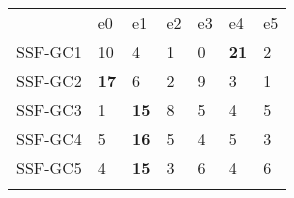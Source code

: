 \begin{tabular}{lllllll}
\noalign{\smallskip}\hline\noalign{\smallskip}
 & e0 & e1 & e2 & e3 & e4 & e5 \\
\noalign{\smallskip}\hline\noalign{\smallskip}
 
SSF-GC1 & 10 & 4 & 1 & 0 & \textbf{21} & 2 \\
SSF-GC2 & \textbf{17} & 6 & 2 & 9 & 3 & 1 \\
SSF-GC3 & 1 & \textbf{15} & 8 & 5 & 4 & 5 \\
SSF-GC4 & 5 & \textbf{16} & 5 & 4 & 5 & 3 \\
SSF-GC5 & 4 & \textbf{15} & 3 & 6 & 4 & 6 \\


\noalign{\smallskip}\hline
\end{tabular} 
